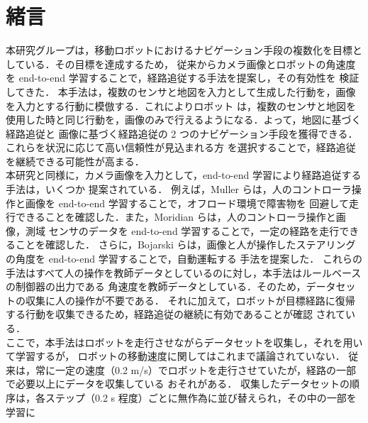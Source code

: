 \documentclass{jarticle}
\begin{document}
\date{} %

\maketitle
\thispagestyle{empty}
\pagestyle{empty}

\small
\section{緒言}
本研究グループは，移動ロボットにおけるナビゲーション手段の複数化を目標としている．その目標を達成するため，
従来からカメラ画像とロボットの角速度を end-to-end 学習することで，経路追従する手法を提案し，その有効性を
検証してきた\cite{okada}\cite{okada2}\cite{kiyooka}．
本手法は，複数のセンサと地図を入力として生成した行動を，画像を入力とする行動に模倣する．これによりロボット
は，複数のセンサと地図を使用した時と同じ行動を，画像のみで行えるようになる．よって，地図に基づく経路追従と
画像に基づく経路追従の 2 つのナビゲーション手段を獲得できる．これらを状況に応じて高い信頼性が見込まれる方
を選択することで，経路追従を継続できる可能性が高まる．\\
\hspace*{1zw}本研究と同様に，カメラ画像を入力として，end-to-end 学習により経路追従する手法は，いくつか
提案されている．
例えば，Muller らは，人のコントローラ操作と画像を end-to-end 学習することで，オフロード環境で障害物を
回避して走行できることを確認した\cite{off_load}．また，Moridian らは，人のコントローラ操作と画像，測域
センサのデータを end-to-end 学習することで，一定の経路を走行できることを確認した\cite{Moridian}．
さらに，Bojarski らは，画像と人が操作したステアリングの角度を end-to-end 学習することで，自動運転する
手法を提案した\cite{Bojarski}．
これらの手法はすべて人の操作を教師データとしているのに対し，本手法はルールベースの制御器の出力である
角速度を教師データとしている．そのため，データセットの収集に人の操作が不要である．
それに加えて，ロボットが目標経路に復帰する行動を収集できるため，経路追従の継続に有効であることが確認
されている\cite{imai}．\\
\hspace*{1zw}ここで，本手法はロボットを走行させながらデータセットを収集し，それを用いて学習するが，
ロボットの移動速度に関してはこれまで議論されていない．
従来は，常に一定の速度（0.2 m/s）でロボットを走行させていたが，経路の一部で必要以上にデータを収集している
おそれがある．
収集したデータセットの順序は，各ステップ（0.2 s 程度）ごとに無作為に並び替えられ，その中の一部を学習に
\end{document}
